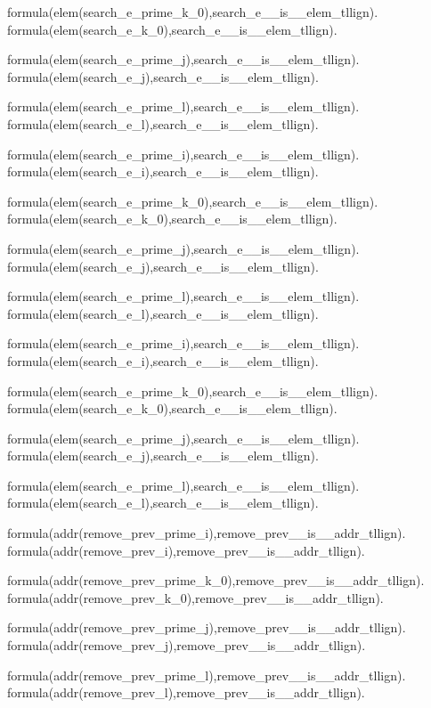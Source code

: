 formula(elem(search\_e\_prime\_k\_0),search\_e\_\_is\_\_elem\_tllign).    formula(elem(search\_e\_k\_0),search\_e\_\_is\_\_elem\_tllign).  

formula(elem(search\_e\_prime\_j),search\_e\_\_is\_\_elem\_tllign).  formula(elem(search\_e\_j),search\_e\_\_is\_\_elem\_tllign).    

formula(elem(search\_e\_prime\_l),search\_e\_\_is\_\_elem\_tllign).  formula(elem(search\_e\_l),search\_e\_\_is\_\_elem\_tllign).    

formula(elem(search\_e\_prime\_i),search\_e\_\_is\_\_elem\_tllign).  formula(elem(search\_e\_i),search\_e\_\_is\_\_elem\_tllign).    

formula(elem(search\_e\_prime\_k\_0),search\_e\_\_is\_\_elem\_tllign).    formula(elem(search\_e\_k\_0),search\_e\_\_is\_\_elem\_tllign).  

formula(elem(search\_e\_prime\_j),search\_e\_\_is\_\_elem\_tllign).  formula(elem(search\_e\_j),search\_e\_\_is\_\_elem\_tllign).    

formula(elem(search\_e\_prime\_l),search\_e\_\_is\_\_elem\_tllign).  formula(elem(search\_e\_l),search\_e\_\_is\_\_elem\_tllign).    

formula(elem(search\_e\_prime\_i),search\_e\_\_is\_\_elem\_tllign).  formula(elem(search\_e\_i),search\_e\_\_is\_\_elem\_tllign).    

formula(elem(search\_e\_prime\_k\_0),search\_e\_\_is\_\_elem\_tllign).    formula(elem(search\_e\_k\_0),search\_e\_\_is\_\_elem\_tllign).  

formula(elem(search\_e\_prime\_j),search\_e\_\_is\_\_elem\_tllign).  formula(elem(search\_e\_j),search\_e\_\_is\_\_elem\_tllign).    

formula(elem(search\_e\_prime\_l),search\_e\_\_is\_\_elem\_tllign).  formula(elem(search\_e\_l),search\_e\_\_is\_\_elem\_tllign).    

formula(addr(remove\_prev\_prime\_i),remove\_prev\_\_is\_\_addr\_tllign).    formula(addr(remove\_prev\_i),remove\_prev\_\_is\_\_addr\_tllign).  

formula(addr(remove\_prev\_prime\_k\_0),remove\_prev\_\_is\_\_addr\_tllign).  formula(addr(remove\_prev\_k\_0),remove\_prev\_\_is\_\_addr\_tllign).    

formula(addr(remove\_prev\_prime\_j),remove\_prev\_\_is\_\_addr\_tllign).    formula(addr(remove\_prev\_j),remove\_prev\_\_is\_\_addr\_tllign).  

formula(addr(remove\_prev\_prime\_l),remove\_prev\_\_is\_\_addr\_tllign).    formula(addr(remove\_prev\_l),remove\_prev\_\_is\_\_addr\_tllign).  

